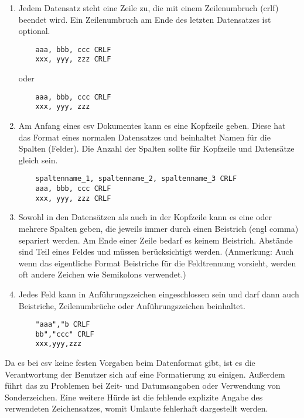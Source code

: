 \begin{enumerate}{}
	
	\item Jedem Datensatz steht eine Zeile zu, die mit einem Zeilenumbruch (\ac{crlf}) beendet wird. Ein Zeilenumbruch am Ende des letzten Datensatzes ist optional. \zB 
	\begin{lstlisting}
	aaa, bbb, ccc CRLF
	xxx, yyy, zzz CRLF
	\end{lstlisting}
	oder
	\begin{lstlisting}
	aaa, bbb, ccc CRLF
	xxx, yyy, zzz
	\end{lstlisting}
	
	\item Am Anfang eines \acs{csv} Dokumentes kann es eine Kopfzeile geben. Diese hat das Format eines normalen Datensatzes und beinhaltet Namen für die Spalten (Felder). Die Anzahl der Spalten sollte für Kopfzeile und Datensätze gleich sein. \zB
	\begin{lstlisting}
	spaltenname_1, spaltenname_2, spaltenname_3 CRLF
	aaa, bbb, ccc CRLF
	xxx, yyy, zzz CRLF
	\end{lstlisting}
	
	\item Sowohl in den Datensätzen als auch in der Kopfzeile kann es eine oder mehrere Spalten geben, die jeweils immer durch einen Beistrich (\acs{engl} comma) separiert werden. Am Ende einer Zeile bedarf es keinem Beistrich. Abstände sind Teil eines Feldes und müssen berücksichtigt werden. (Anmerkung: Auch wenn das eigentliche Format Beistriche für die Feldtrennung vorsieht, werden oft andere Zeichen wie \zB Semikolons verwendet.)
	
	\item Jedes Feld kann in Anführungszeichen eingeschlossen sein und darf dann auch Beistriche, Zeilenumbrüche oder Anführungszeichen beinhaltet. \zB
	\begin{lstlisting}
	"aaa","b CRLF
	bb","ccc" CRLF
	xxx,yyy,zzz
	\end{lstlisting}
	
\end{enumerate}

Da es bei \acs{csv} keine festen Vorgaben beim Datenformat gibt, ist es die Verantwortung der Benutzer sich auf eine Formatierung zu einigen. Außerdem führt das zu Problemen bei Zeit- und Datumsangaben oder Verwendung von Sonderzeichen. Eine weitere Hürde ist die fehlende explizite Angabe des verwendeten Zeichensatzes, womit \zB Umlaute fehlerhaft dargestellt werden. \cite{FuchsMediaSolutions:o.J.}

